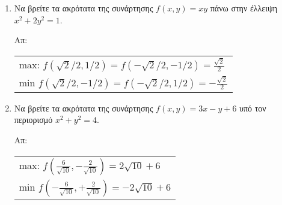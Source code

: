 \documentclass[a4paper,table]{report}
\begin{document}
\begin{enumerate}

  \item Να βρείτε τα ακρότατα της συνάρτησης $ f(x,y) = xy $ πάνω στην έλλειψη 
    $ x^{2}+2y^{2}=1 $.

    \hfill Απ: 
    \begin{tabular}{l}
      max: $ f(\sqrt{2} /2, 1/2) = f(- \sqrt{2} /2, -1/2) = \frac{\sqrt{2}}{2} $ \\
      min $ f(\sqrt{2} /2, -1/2) = f(- \sqrt{2} /2, 1/2) = -\frac{\sqrt{2}}{2} $ \\
    \end{tabular}

  \item Να βρείτε τα ακρότατα της συνάρτησης $ f(x,y) = 3x-y+6 $ υπό τον περιορισμό 
    $ x^{2}+y^{2}=4 $.

    \hfill Απ:  
    \begin{tabular}{l}
      max: $ f(\frac{6}{\sqrt{10}} , - \frac{2}{\sqrt{10}}) = 2 \sqrt{10} +6 $ \\
      min $ f(-\frac{6}{\sqrt{10}} , + \frac{2}{\sqrt{10}}) = -2 \sqrt{10} +6 $ \\
    \end{tabular}






\end{enumerate}
\end{document}
